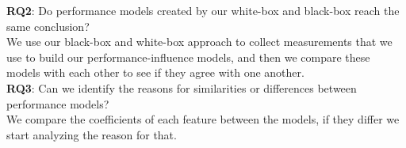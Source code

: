 \noindent \textbf{RQ2}: Do performance models created by our white-box and black-box reach the same conclusion?\\

\noindent We use our black-box and white-box approach to collect measurements that we use to build our performance-influence models, and then we compare these models with each other to see if they agree with one another. \\

\noindent \textbf{RQ3}: Can we identify the reasons for similarities or differences between performance models?\\

\noindent We compare the coefficients of each feature between the models, if they differ we start analyzing the reason for that. \\
